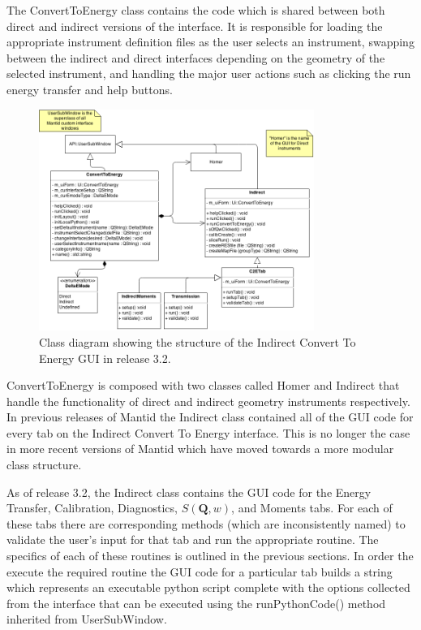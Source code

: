 \documentclass[paper=a4, fontsize=11pt]{scrartcl}	%
\numberwithin{equation}{section}															%
\numberwithin{figure}{section}																%
\numberwithin{table}{section}																%
\begin{document}
The ConvertToEnergy class contains the code which is shared between both direct and indirect versions of the interface. It is responsible for loading the appropriate instrument definition files as the user selects an instrument, swapping between the indirect and direct interfaces depending on the geometry of the selected instrument, and handling the major user actions such as clicking the run energy transfer and help buttons.

\begin{figure}[H]
\centering
\includegraphics[width=0.8\textwidth]{img/uml/class_diagrams/C2E_structure.png}
\caption{Class diagram showing the structure of the Indirect Convert To Energy GUI in release 3.2.}
\label{fig:c2e-class-diagram}
\end{figure}

ConvertToEnergy is composed with two classes called Homer and Indirect that handle the functionality of direct and indirect geometry instruments respectively. In previous releases of Mantid the Indirect class contained all of the GUI code for every tab on the Indirect Convert To Energy interface. This is no longer the case in more recent versions of Mantid which have moved towards a more modular class structure.

As of release 3.2, the Indirect class contains the GUI code for the Energy Transfer, Calibration, Diagnostics, $S(\textbf{Q},w)$, and Moments tabs. For each of these tabs there are corresponding methods (which are inconsistently named) to validate the user's input for that tab and run the appropriate routine. The specifics of each of these routines is outlined in the previous sections. In order the execute the required routine the GUI code for a particular tab builds a string which represents an executable python script complete with the options collected from the interface that can be executed using the runPythonCode() method inherited from UserSubWindow.
\end{document}
